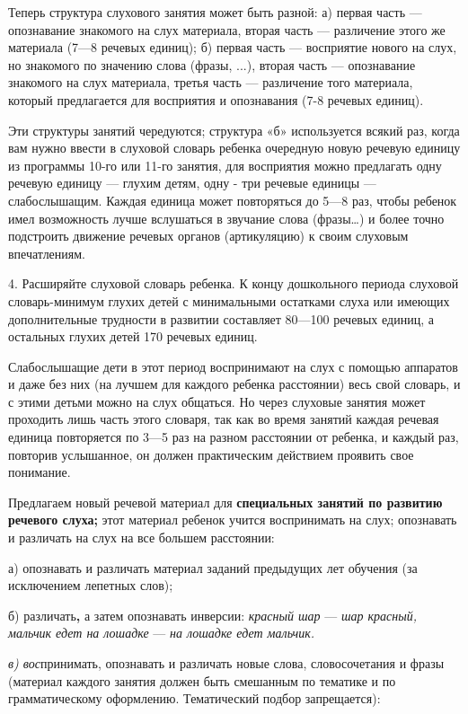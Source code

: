\documentclass[a5paper]{book}
\renewcommand{\emph}[1]{\textit{#1}}
\begin{document}
Теперь структура слухового занятия может быть разной: а) первая часть
--- опознавание знакомого на слух материала, вторая часть --- различение
этого же материала (7---8 речевых единиц); б) первая часть ---
восприятие нового на слух, но знакомого по значению слова (фразы, ...),
вторая часть --- опознавание знакомого на слух материала, третья часть
--- различение того материала, который предлагается для восприятия и
опознавания (7-8 речевых единиц).

Эти структуры занятий чередуются; структура «б» используется всякий раз,
когда вам нужно ввести в слуховой словарь ребенка очередную новую
речевую единицу из программы 10-го или 11-го занятия, для восприятия
можно предлагать одну речевую единицу --- глухим детям, одну - три
речевые единицы --- слабослышащим. Каждая единица может повторяться до
5---8 раз, чтобы ребенок имел возможность лучше вслушаться в звучание
слова (фразы\ldots) и более точно подстроить движение речевых органов
(артикуляцию) к своим слуховым впечатлениям.

4. Расширяйте слуховой словарь ребенка. К концу дошкольного периода
слуховой словарь-минимум глухих детей с минимальными остатками слуха или
имеющих дополнительные трудности в развитии составляет 80---100 речевых
единиц, а остальных глухих детей 170 речевых единиц.

Слабослышащие дети в этот период воспринимают на слух с помощью
аппаратов и даже без них (на лучшем для каждого ребенка расстоянии) весь
свой словарь, и с этими детьми можно на слух общаться. Но через слуховые
занятия может проходить лишь часть этого словаря, так как во время
занятий каждая речевая единица повторяется по 3---5 раз на разном
расстоянии от ребенка, и каждый раз, повторив услышанное, он должен
практическим действием проявить свое понимание.

Предлагаем новый речевой материал для \textbf{специальных занятий по
развитию речевого слуха;} этот материал ребенок учится воспринимать на
слух; опознавать и различать на слух на все большем расстоянии:

а) опознавать и различать материал заданий предыдущих лет обучения (за
исключением лепетных слов);

б) различать\textbf{,} а затем опознавать инверсии: \emph{красный шар}
--- \emph{шар красный, мальчик едет на лошадке} --- \emph{на лошадке
едет мальчик.}

\emph{в) вос}принимать, опознавать и различать новые слова,
словосочетания и фразы (материал каждого занятия должен быть смешанным
по тематике и по грамматическому оформлению. Тематический подбор
запрещается):
\end{document}
